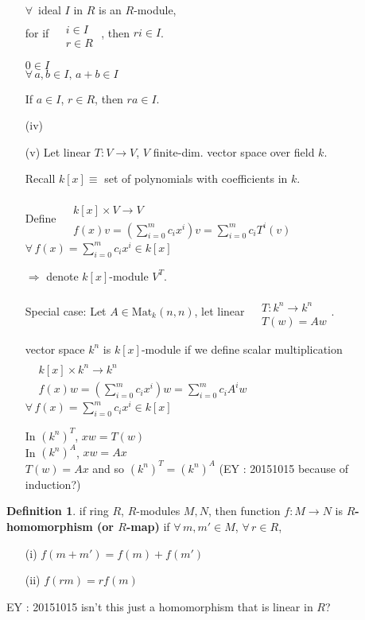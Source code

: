 \documentclass[twoside,landscape]{amsart}
\theoremstyle{plain}
\theoremstyle{definition}
\newtheorem{definition}{Definition}
\theoremstyle{remark}
\begin{document}
\begin{multicols*}{2}
\begin{enumerate}
$\forall \, $ ideal $I$ in $R$ is an $R$-module, \\
for if $\begin{aligned} & \quad \\
  & i \in I \\
  & r\in R \end{aligned}$ , then $ri \in I$.

$0\in I$ \\
$\forall \, a,b \in I, \, a+b \in I$


If $a\in I$, $r\in R$, then $ra \in I$.


\item[(iv)]
\item[(v)] Let linear $T:V \to V$, $V$ finite-dim. vector space over field $k$.  

Recall $k[x] \equiv $ set of polynomials with coefficients in $k$.  

Define $\begin{aligned} & \quad \\
  & k[x] \times V \to V \\
  & f(x)v =\left(\sum_{i=0}^m c_i x^i\right)v =\sum_{i=0}^m c_iT^i(v) \end{aligned}$ \quad \, $\forall \, f(x) = \sum_{i=0}^m c_ix^i \in k[x]$

$\Longrightarrow $ denote $k[x]$-module $V^T$.  

Special case: Let $A \in \text{Mat}_k(n,n)$, let linear $\begin{aligned} & \quad \\
  & T :k^n \to k^n \\
  & T(w) = Aw \end{aligned}$.  

vector space $k^n$ is $k[x]$-module if we define scalar multiplication $\begin{aligned} & \quad \\
  & k[x] \times k^n \to k^n \\
  & f(x)w = \left( \sum_{i=0}^m c_ix^i \right)w = \sum_{i=0}^m c_i A^i w \end{aligned}$ \quad \, $\forall \, f(x) = \sum_{i=0}^m c_ix^i \in k[x]$

In $(k^n)^T$, $xw = T(w)$ \\
In $(k^n)^A$, $xw = Ax $ \\
$T(w) = Ax$ and so $(k^n)^T = (k^n)^A$  (EY : 20151015 because of induction?)
\end{enumerate}

\begin{definition}
if ring $R$, $R$-modules $M,N$, then function $f:M\to N$ is \textbf{ $R$-homomorphism (or $R$-map) } if $\forall \, m,m' \in M$, $\forall \, r \in R$, 
\begin{enumerate}
  \item[(i)] $f(m+m') = f(m)+f(m')$
  \item[(ii)] $f(rm)=rf(m)$
\end{enumerate}
\end{definition}
EY : 20151015 isn't this just a homomorphism that is linear in $R$? 


\end{multicols*}
\end{document}
